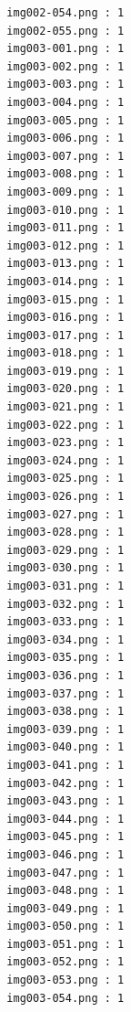 \documentclass[12pt,a4paper]{article}
\begin{document}
\begin{lstlisting}
                     img002-054.png : 1
                     img002-055.png : 1
                     img003-001.png : 1
                     img003-002.png : 1
                     img003-003.png : 1
                     img003-004.png : 1
                     img003-005.png : 1
                     img003-006.png : 1
                     img003-007.png : 1
                     img003-008.png : 1
                     img003-009.png : 1
                     img003-010.png : 1
                     img003-011.png : 1
                     img003-012.png : 1
                     img003-013.png : 1
                     img003-014.png : 1
                     img003-015.png : 1
                     img003-016.png : 1
                     img003-017.png : 1
                     img003-018.png : 1
                     img003-019.png : 1
                     img003-020.png : 1
                     img003-021.png : 1
                     img003-022.png : 1
                     img003-023.png : 1
                     img003-024.png : 1
                     img003-025.png : 1
                     img003-026.png : 1
                     img003-027.png : 1
                     img003-028.png : 1
                     img003-029.png : 1
                     img003-030.png : 1
                     img003-031.png : 1
                     img003-032.png : 1
                     img003-033.png : 1
                     img003-034.png : 1
                     img003-035.png : 1
                     img003-036.png : 1
                     img003-037.png : 1
                     img003-038.png : 1
                     img003-039.png : 1
                     img003-040.png : 1
                     img003-041.png : 1
                     img003-042.png : 1
                     img003-043.png : 1
                     img003-044.png : 1
                     img003-045.png : 1
                     img003-046.png : 1
                     img003-047.png : 1
                     img003-048.png : 1
                     img003-049.png : 1
                     img003-050.png : 1
                     img003-051.png : 1
                     img003-052.png : 1
                     img003-053.png : 1
                     img003-054.png : 1




\end{lstlisting}
\end{document}

